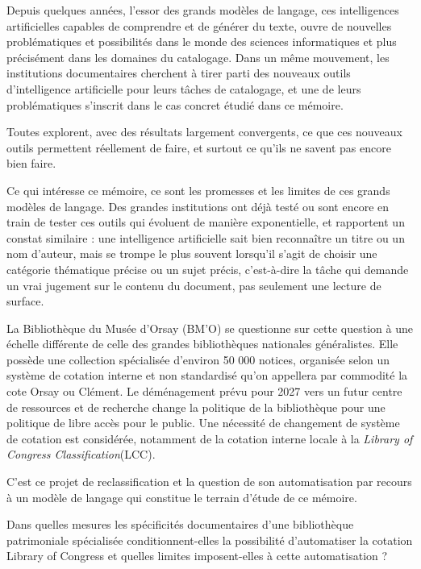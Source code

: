 Depuis quelques années, l'essor des grands modèles de langage, ces intelligences artificielles capables de comprendre et de générer du texte, ouvre de nouvelles problématiques et possibilités dans le monde des sciences informatiques et plus précisément dans les domaines du catalogage. Dans un même mouvement, les institutions documentaires cherchent à tirer parti des nouveaux outils d'intelligence artificielle pour leurs tâches de catalogage, et une de leurs problématiques s'inscrit dans le cas concret étudié dans ce mémoire.


 Toutes explorent, avec des résultats largement convergents, ce que ces nouveaux outils permettent réellement de faire, et surtout ce qu'ils ne savent pas encore bien faire.


Ce qui intéresse ce mémoire, ce sont les promesses et les limites de ces grands modèles de langage. Des grandes institutions ont déjà testé ou sont encore en train de tester ces outils qui évoluent de manière exponentielle, et rapportent un constat similaire : une intelligence artificielle sait bien reconnaître un titre ou un nom d'auteur, mais se trompe le plus souvent lorsqu'il s'agit de choisir une catégorie thématique précise ou un sujet précis, c'est-à-dire la tâche qui demande un vrai jugement sur le contenu du document, pas seulement une lecture de surface.

La Bibliothèque du Musée d'Orsay (BM'O) se questionne sur cette question à une échelle différente de celle des grandes bibliothèques nationales généralistes. Elle possède une collection  spécialisée d'environ 50 000 notices, organisée  selon un système de cotation interne et non standardisé qu'on appellera par commodité la cote Orsay ou Clément. Le déménagement prévu pour 2027 vers un futur centre de ressources et de recherche change la politique de la bibliothèque pour une politique de libre accès pour le public. Une nécessité de changement de système de cotation est considérée, notamment de la cotation interne locale à la \textit{Library of Congress Classification}(LCC). 


C'est ce projet de reclassification et la question de son automatisation par recours à un modèle de langage qui constitue le terrain d'étude de ce mémoire.

 Dans quelles mesures les spécificités documentaires d'une bibliothèque patrimoniale spécialisée conditionnent-elles la possibilité d'automatiser la cotation Library of Congress et quelles limites imposent-elles à cette automatisation ? 

